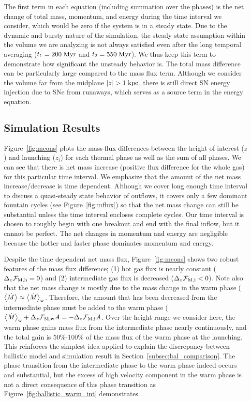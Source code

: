 \documentclass[twocolumn]{aastex62}
\newcommand\Myr{\;{\rm Myr}}
\newcommand\kpc{\;{\rm kpc}}
\newcommand\abrackets[1]{\left\langle{#1}\right\rangle}
\begin{document}
The first term in each equation (including summation over the phases) is the net change of total mass, momentum, and energy during the time interval we consider, which would be zero if the system is in a steady state. Due to the dynamic and bursty nature of the simulation, the steady state assumption within the volume we are analyzing is not always satisfied even after the long temporal averaging ($t_1=200\Myr$ and $t_2=550\Myr$). We thus keep this term to demonstrate how significant the unsteady behavior is. The total mass difference can be particularly large compared to the mass flux term. Although we consider the volume far from the midplane $|z|>1\kpc$, there is still direct SN energy injection due to SNe from runaways, which serves as a source term in the energy equation.

\subsection{Simulation Results\label{sec:flux_simulation}}
Figure~\ref{fig:mcons} plots the mass flux differences between the height of interest ($z$) and launching ($z_i$) for each thermal phase as well as the sum of all phases. We can see that there is net mass increase (positive flux difference for the whole gas) for this particular time interval. We emphasize that the amount of the net mass increase/decrease is time dependent. Although we cover long enough time interval to discuss a quasi-steady state behavior of outflows, it covers only a few dominant fountain cycles (see Figure~\ref{fig:mflux}) so that the net mass change can still be substantial unless the time interval encloses complete cycles. Our time interval is chosen to roughly begin with one breakout and end with the final inflow, but it cannot be perfect. The net changes in momentum and energy are negligible because the hotter and faster phase dominates momentum and energy.

Despite the time dependent net mass flux, Figure~\ref{fig:mcons} shows two robust features of the mass flux difference; (1) hot gas flux is nearly constant ($\Delta_z \mathcal{F}_{\rm M,h} = 0$) and (2) intermediate gas flux is decreased ($\Delta_z \mathcal{F}_{\rm M,i} < 0$). Note also that the net mass change is mostly due to the mass change in the warm phase ($\abrackets{\dot{M}}\approx\abrackets{\dot{M}}_{\rm w}$. Therefore, the amount that has been decreased from the intermediate phase must be added to the warm phase ($\abrackets{\dot{M}}_{\rm w} + \Delta_z \mathcal{F}_{\rm M,w}A = - \Delta_z \mathcal{F}_{\rm M,i}A$. Over the height range we consider here, the warm phase gains mass flux from the intermediate phase nearly continuously, and the total gain is 50\%-100\% of the mass flux of the warm phase at the launching. This reinforces the simplest idea applied to explain the discrepancy between ballistic model and simulation result in Section~\ref{subsec:bal_comparison}. The phase transition from the intermediate phase to the warm phase indeed occurs and substantial, but the excess of high velocity component in the warm phase is not a direct consequence of this phase transition as Figure~\ref{fig:ballistic_warm_int} demonstrates.
\end{document}
